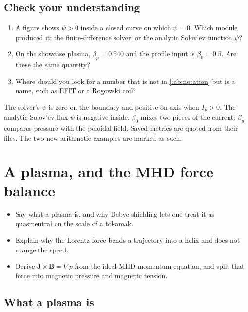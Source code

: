 \documentclass[11pt,a4paper,oneside,openany]{book}
\numberwithin{equation}{chapter}
\newcommand{\psibar}{\bar{\psi}}
\newcommand{\grad}{\nabla}
\newcommand{\Ip}{I_{p}}
\theoremstyle{definition}
\begin{document}
\section*{Check your understanding}
\begin{enumerate}[label=\textbf{Q1.\arabic*.},leftmargin=2.4em]
\item A figure shows \(\psi>0\) inside a closed curve on which \(\psi=0\). Which module produced it: the finite-difference solver, or the analytic Solov'ev function \(\psibar\)?
\item On the showcase plasma, \(\beta_{p}=0.540\) and the profile input is \(\beta_{0}=0.5\). Are these the same quantity?
\item Where should you look for a number that is not in \cref{tab:notation} but is a name, such as EFIT or a Rogowski coil?
\end{enumerate}

\begin{keyideas}
The solver's \(\psi\) is zero on the boundary and positive on axis when \(\Ip>0\). The analytic Solov'ev flux \(\psibar\) is negative inside. \(\beta_{0}\) mixes two pieces of the current; \(\beta_{p}\) compares pressure with the poloidal field. Saved metrics are quoted from their files. The two new arithmetic examples are marked as such.
\end{keyideas}

\chapter{A plasma, and the MHD force balance}
\label{ch:mhd}

\begin{objectives}
\begin{itemize}[leftmargin=1.2em]
\item Say what a plasma is, and why Debye shielding lets one treat it as quasineutral on the scale of a tokamak.
\item Explain why the Lorentz force bends a trajectory into a helix and does not change the speed.
\item Derive \(\mathbf{J}\times\mathbf{B}=\grad p\) from the ideal-MHD momentum equation, and split that force into magnetic pressure and magnetic tension.
\end{itemize}
\end{objectives}

\section{What a plasma is}
\end{document}
